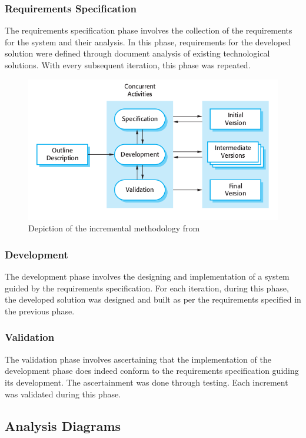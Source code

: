 \documentclass[12pt, a4paper]{article}
\begin{document}
\subsubsection{Requirements Specification}
The requirements specification phase involves the collection of the requirements for the system and their analysis. In this phase, requirements for the developed solution were defined through document analysis of existing technological solutions. With every subsequent iteration, this phase was repeated.
\begin{figure}[h]
    \centering
    \setlength{\fboxsep}{8pt}
    \includegraphics[scale=0.5, fbox]{sommerville.png}
    \caption{Depiction of the incremental methodology from \citep{sommerville2011software}}
    \label{fig:methodology}
\end{figure}
\subsubsection{Development}
The development phase involves the designing and implementation of a system guided by the requirements specification. For each iteration, during this phase, the developed solution was designed and built as per the requirements specified in the previous phase.
\subsubsection{Validation}
The validation phase involves ascertaining that the implementation of the development phase does indeed conform to the requirements specification guiding its development. The ascertainment was done through testing. Each increment was validated during this phase.
\subsection{Analysis Diagrams}
\end{document}
